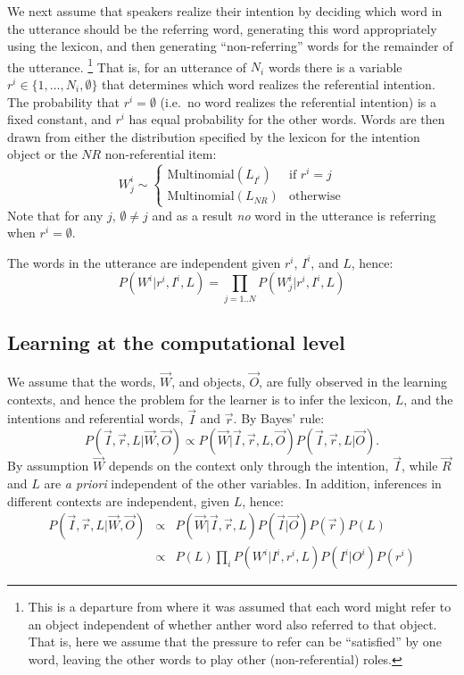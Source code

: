 \documentclass[man,noapacite,12pt]{apa2}
\newcommand{\nnote}[1]{\textcolor{blue}{[#1]}}
\begin{document}
We next assume that speakers realize their intention by deciding which word in the utterance should be the referring word, generating this word appropriately using the lexicon, and then generating ``non-referring'' words for the remainder of the utterance. \footnote{This is a departure from  where it was assumed that each word might refer to an object independent of whether anther word also referred to that object. That is, here we assume that the pressure to refer can be ``satisfied'' by one word, leaving the other words to play other (non-referential) roles.}
That is, for an utterance of $N_{i}$ words there is a variable $r^{i} \in \{1,\dots,N_{i}, \emptyset \}$ that determines which word realizes the referential intention. The probability that $r^{i}=\emptyset$ (i.e.~no word realizes the referential intention) is a fixed constant, and $r^{i}$ has equal probability for the other words.
Words are then drawn from either the distribution specified by the lexicon for the intention object or the $NR$ non-referential item:
\begin{equation}
W^{i}_{j} \sim 
\begin{cases}
\text{Multinomial}(L_{I^{i}}) & \text{if } r^{i}=j \\
\text{Multinomial}(L_{NR}) & \text{otherwise}
\end{cases}
\end{equation}
Note that for any $j$, $\emptyset \neq j$ and as a result \emph{no} word in the utterance is referring when $r^{i}=\emptyset$.

The words in the utterance are independent given $r^{i}$, $I^{i}$, and $L$, hence:
\begin{equation}
P(W^{i}|r^{i}, I^{i}, L) = \prod_{j=1..N}P(W^{i}_{j}|r^{i}, I^{i}, L)
\end{equation}


\subsection{Learning at the computational level}

We assume that the words, $\vec{W}$, and objects, $\vec{O}$, are fully observed in the learning contexts, and hence the problem for the learner is to infer the lexicon, $L$, and the intentions and referential words, $\vec{I}$ and $\vec{r}$. By Bayes' rule:
$$
P( \vec{I}, \vec{r}, L | \vec{W}, \vec{O}) \propto P(\vec{W}| \vec{I}, \vec{r}, L, \vec{O} )  P(\vec{I},\vec{r},L | \vec{O}).
$$
By assumption $\vec{W}$ depends on the context only through the intention, $\vec{I}$, while $\vec{R}$ and $L$ are \emph{a priori} independent of the other variables. In addition, inferences in different contexts are independent, given $L$, hence:
\begin{eqnarray}
P( \vec{I}, \vec{r}, L | \vec{W}, \vec{O}) &\propto& P(\vec{W}| \vec{I}, \vec{r}, L ) P(\vec{I} | \vec{O}) P(\vec{r})P(L) \\
&\propto& P(L) \prod_{i} P(W^{i}| I^{i}, r^{i}, L ) P(I^{i} | O^{i}) P(r^{i})
\end{eqnarray}
\end{document}
